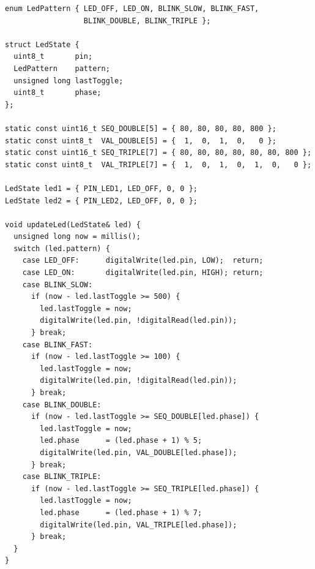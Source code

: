 \begin{lstlisting}[caption={LED blink state machine}, label={lst:fw-led}]
enum LedPattern { LED_OFF, LED_ON, BLINK_SLOW, BLINK_FAST,
                  BLINK_DOUBLE, BLINK_TRIPLE };

struct LedState {
  uint8_t       pin;
  LedPattern    pattern;
  unsigned long lastToggle;
  uint8_t       phase;
};

static const uint16_t SEQ_DOUBLE[5] = { 80, 80, 80, 80, 800 };
static const uint8_t  VAL_DOUBLE[5] = {  1,  0,  1,  0,   0 };
static const uint16_t SEQ_TRIPLE[7] = { 80, 80, 80, 80, 80, 80, 800 };
static const uint8_t  VAL_TRIPLE[7] = {  1,  0,  1,  0,  1,  0,   0 };

LedState led1 = { PIN_LED1, LED_OFF, 0, 0 };
LedState led2 = { PIN_LED2, LED_OFF, 0, 0 };

void updateLed(LedState& led) {
  unsigned long now = millis();
  switch (led.pattern) {
    case LED_OFF:      digitalWrite(led.pin, LOW);  return;
    case LED_ON:       digitalWrite(led.pin, HIGH); return;
    case BLINK_SLOW:
      if (now - led.lastToggle >= 500) {
        led.lastToggle = now;
        digitalWrite(led.pin, !digitalRead(led.pin));
      } break;
    case BLINK_FAST:
      if (now - led.lastToggle >= 100) {
        led.lastToggle = now;
        digitalWrite(led.pin, !digitalRead(led.pin));
      } break;
    case BLINK_DOUBLE:
      if (now - led.lastToggle >= SEQ_DOUBLE[led.phase]) {
        led.lastToggle = now;
        led.phase      = (led.phase + 1) % 5;
        digitalWrite(led.pin, VAL_DOUBLE[led.phase]);
      } break;
    case BLINK_TRIPLE:
      if (now - led.lastToggle >= SEQ_TRIPLE[led.phase]) {
        led.lastToggle = now;
        led.phase      = (led.phase + 1) % 7;
        digitalWrite(led.pin, VAL_TRIPLE[led.phase]);
      } break;
  }
}
\end{lstlisting}

